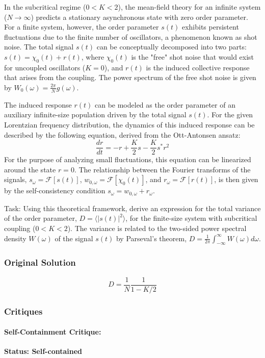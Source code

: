 \documentclass[10pt]{article}
\begin{document}
In the subcritical regime ($0 < K < 2$), the mean-field theory for an infinite system ($N \to \infty$) predicts a stationary asynchronous state with zero order parameter. For a finite system, however, the order parameter $s(t)$ exhibits persistent fluctuations due to the finite number of oscillators, a phenomenon known as shot noise. The total signal $s(t)$ can be conceptually decomposed into two parts: $s(t) = \chi_0(t) + r(t)$, where $\chi_0(t)$ is the "free" shot noise that would exist for uncoupled oscillators ($K=0$), and $r(t)$ is the induced collective response that arises from the coupling. The power spectrum of the free shot noise is given by $W_0(\omega) = \frac{2\pi}{N} g(\omega)$.

The induced response $r(t)$ can be modeled as the order parameter of an auxiliary infinite-size population driven by the total signal $s(t)$. For the given Lorentzian frequency distribution, the dynamics of this induced response can be described by the following equation, derived from the Ott-Antonsen ansatz:
$$ \frac{dr}{dt} = -r + \frac{K}{2}s - \frac{K}{2}s^*r^2 $$
For the purpose of analyzing small fluctuations, this equation can be linearized around the state $r=0$. The relationship between the Fourier transforms of the signals, $s_\omega = \mathcal{F}[s(t)]$, $w_{0,\omega} = \mathcal{F}[\chi_0(t)]$, and $r_\omega = \mathcal{F}[r(t)]$, is then given by the self-consistency condition $s_\omega = w_{0,\omega} + r_\omega$.

Task:
Using this theoretical framework, derive an expression for the total variance of the order parameter, $D = \langle |s(t)|^2 \rangle$, for the finite-size system with subcritical coupling ($0 < K < 2$). The variance is related to the two-sided power spectral density $W(\omega)$ of the signal $s(t)$ by Parseval's theorem, $D = \frac{1}{2\pi} \int_{-\infty}^{\infty} W(\omega) d\omega$.

\subsubsection*{Original Solution}
\[ D=\frac{1}{N}\frac{1}{1-K/2} \]

\subsubsection*{Critiques}
\paragraph*{Self-Containment Critique:}
\textcolor{pass}{\textbf{Status: Self-contained}}
\end{document}
